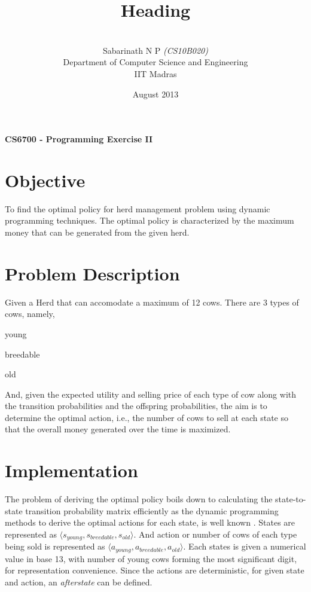\documentclass[a4paper,10pt]{report}
\title{\huge{\textbf{Heading}}}
\author{\\[0.5cm] Sabarinath N P \emph{(CS10B020)}
	\\[0.5cm] Department of Computer Science and Engineering \\[0.2cm]
	IIT Madras\\[1.0cm]
}
\date{August 2013}
\newenvironment{my_itemize}{
\begin{itemize}
  \setlength{\itemsep}{1pt}
  \setlength{\parskip}{0pt}
  \setlength{\parsep}{0pt}}{
\end{itemize}}
\begin{document}
\renewcommand{\thesection}{1.\arabic{section}}

\begin{center}
\begin{Large}
\textbf{CS6700 - Programming Exercise II}
\end{Large}
\vspace{5 mm}

\end{center}

\section{Objective}

To find the optimal policy for herd management problem using dynamic programming techniques. 
The optimal policy is characterized by the maximum money that can be generated from the given herd.

\section{Problem Description}
Given a Herd that can accomodate a maximum of 12 cows. There are 3 types of cows, namely,
\begin{my_itemize}
 \item young
 \item breedable
 \item old
\end{my_itemize}
And, given the expected utility and selling price of each type of cow along with the transition probabilities and the offspring probabilities,
the aim is to determine the optimal action, i.e., the number of cows to sell at each state so that the overall money generated over the time is maximized.

\section{Implementation}
The problem of deriving the optimal policy boils down to calculating the state-to-state transition probability matrix efficiently
as the dynamic programming methods to derive the optimal actions for each state, is well known \cite{book}.
States are represented as $\langle s_{young},s_{breedable},s_{old}\rangle$.
And action or number of cows of each type being sold is represented as $\langle a_{young},a_{breedable},a_{old}\rangle$.
Each states is given a numerical value in base 13, with number of young cows forming the most significant digit, for representation convenience.
Since the actions are deterministic, for given state and action, an \emph{afterstate} can be defined.
\end{document}
